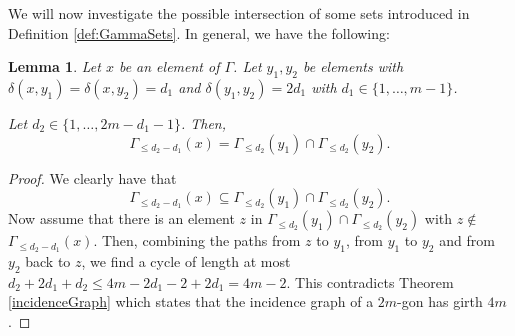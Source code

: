 \documentclass[12pt]{article}
\newtheorem{lemma}{Lemma}
\theoremstyle{remark}
\begin{document}
We will now investigate the possible intersection of some sets introduced in Definition \ref{def:GammaSets}. In general, we have the following:
\begin{lemma}\label{intersections1}
	Let \(x\) be an element of $\Gamma$. Let $y_1, y_2$ be elements with $\delta(x,y_1)=\delta(x,y_2)=d_1$ and $\delta(y_1,y_2)=2d_1$ with \(d_1\in\{1,\dots,m-1\}\). 
    
    Let \(d_2\in\{1,\dots,2m-d_1-1\}\).
	Then,
	\[\Gamma_{\le d_2-d_1}(x) = \Gamma_{\le d_2}(y_1)\cap\Gamma_{\le d_2}(y_2).\]
\end{lemma}
\begin{proof}
	We clearly have that
	\[\Gamma_{\le d_2-d_1}(x) \subseteq \Gamma_{\le d_2}(y_1)\cap\Gamma_{\le d_2}(y_2).\]
	Now assume that there is an element \(z\) in \(\Gamma_{\le d_2}(y_1)\cap\Gamma_{\le d_2}(y_2)\) with \(z\not\in\)  \(\Gamma_{\le d_2-d_1}(x)\). Then, combining the paths from \(z\) to \(y_1\), from \(y_1\) to \(y_2\) and from \(y_2\) back to \(z\), we find a cycle of length at most \(d_2 + 2d_1+ d_2 \le 4m-2d_1-2+2d_1 = 4m-2.\) This contradicts Theorem \ref{incidenceGraph} which states that the incidence graph of a \(2m\)-gon has girth \(4m\).
\end{proof}
\end{document}
